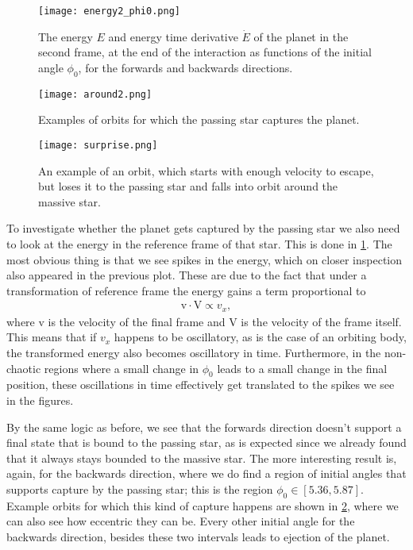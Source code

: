 \documentclass[10pt,a4paper,twocolumn]{article}
\renewcommand{\vec}[1]{\bm{\mathrm{#1}}}
\begin{document}
\begin{figure}[t]
    \centering
    \texttt{[image: energy2\_phi0.png]}
    \caption{The energy $E$ and energy time derivative $\dot{E}$ of the planet in the second frame, at the end of the interaction as functions of the initial angle $\phi_0$, for the forwards and backwards directions.}
    \label{fig:energy2_phi0}
\end{figure}

\begin{figure}[t]
    \centering
    \texttt{[image: around2.png]}
    \caption{Examples of orbits for which the passing star captures the planet.}
    \label{fig:around2}
\end{figure}

\begin{figure}[t]
    \centering
    \texttt{[image: surprise.png]}
    \caption{An example of an orbit, which starts with enough velocity to escape, but loses it to the passing star and falls into orbit around the massive star.}
    \label{fig:surprise}
\end{figure}

To investigate whether the planet gets captured by the passing star we also need to look at the energy in the reference frame of that star. This is done in \cref{fig:energy2_phi0}. The most obvious thing is that we see spikes in the energy, which on closer inspection also appeared in the previous plot. These are due to the fact that under a transformation of reference frame the energy gains a term proportional to 
%
\begin{align}
    \vec{v} \cdot \vec{V} \propto v_x,
\end{align}
%
where $\vec{v}$ is the velocity of the final frame and $\vec{V}$ is the velocity of the frame itself. This means that if $v_x$ happens to be oscillatory, as is the case of an orbiting body, the transformed energy also becomes oscillatory in time. Furthermore, in the non-chaotic regions where a small change in $\phi_0$ leads to a small change in the final position, these oscillations in time effectively get translated to the spikes we see in the figures.

By the same logic as before, we see that the forwards direction doesn't support a final state that is bound to the passing star, as is expected since we already found that it always stays bounded to the massive star. The more interesting result is, again, for the backwards direction, where we do find a region of initial angles that supports capture by the passing star; this is the region $\phi_0 \in [5.36, 5.87]$. Example orbits for which this kind of capture happens are shown in \cref{fig:around2}, where we can also see how eccentric they can be. Every other initial angle for the backwards direction, besides these two intervals leads to ejection of the planet.
\end{document}
